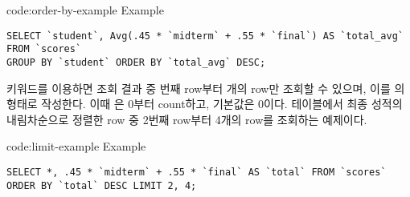 \begin{code}{code:order-by-example}{ Example}
\begin{verbatim}
SELECT `student`, Avg(.45 * `midterm` + .55 * `final`) AS `total_avg` FROM `scores`
GROUP BY `student` ORDER BY `total_avg` DESC;
\end{verbatim}
\end{code}

 키워드를 이용하면 조회 결과 중 번째 row부터 개의 row만 조회할 수 있으며, 이를 의 형태로 작성한다. 이때 은 0부터 count하고, 기본값은 0이다. \은  테이블에서 최종 성적의 내림차순으로 정렬한 row 중 2번째 row부터 4개의 row를 조회하는 예제이다.

\begin{code}{code:limit-example}{ Example}
\begin{verbatim}
SELECT *, .45 * `midterm` + .55 * `final` AS `total` FROM `scores`
ORDER BY `total` DESC LIMIT 2, 4;
\end{verbatim}
\end{code}
